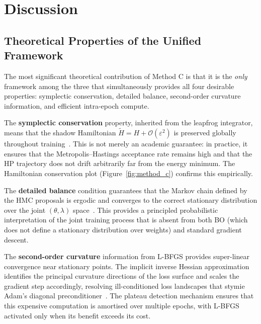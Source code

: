 \documentclass[11pt]{article}
\begin{document}


\section{Discussion}

\subsection{Theoretical Properties of the Unified Framework}

The most significant theoretical contribution of Method C is that it
is the \emph{only} framework among the three that simultaneously
provides all four desirable properties: symplectic conservation,
detailed balance, second-order curvature information, and efficient
intra-epoch compute.

The \textbf{symplectic conservation} property, inherited from the
leapfrog integrator, means that the shadow Hamiltonian
$\tilde{H} = H + \mathcal{O}(\varepsilon^2)$ is preserved globally
throughout training~\cite{hairer2006}.  This is not merely an academic
guarantee: in practice, it ensures that the Metropolis--Hastings
acceptance rate remains high and that the HP trajectory does not drift
arbitrarily far from the energy minimum.  The Hamiltonian conservation
plot (Figure~\ref{fig:method_c}) confirms this empirically.

The \textbf{detailed balance} condition guarantees that the Markov
chain defined by the HMC proposals is ergodic and converges to the
correct stationary distribution over the joint $(\theta, \lambda)$
space~\cite{betancourt2017}.  This provides a principled probabilistic
interpretation of the joint training process that is absent from both
BO (which does not define a stationary distribution over weights) and
standard gradient descent.

The \textbf{second-order curvature} information from L-BFGS provides
super-linear convergence near stationary points.  The implicit inverse
Hessian approximation identifies the principal curvature directions of
the loss surface and scales the gradient step accordingly, resolving
ill-conditioned loss landscapes that stymie Adam's diagonal
preconditioner~\cite{liu1989lbfgs}.  The plateau detection mechanism
ensures that this expensive computation is amortised over multiple
epochs, with L-BFGS activated only when its benefit exceeds its cost.
\end{document}
